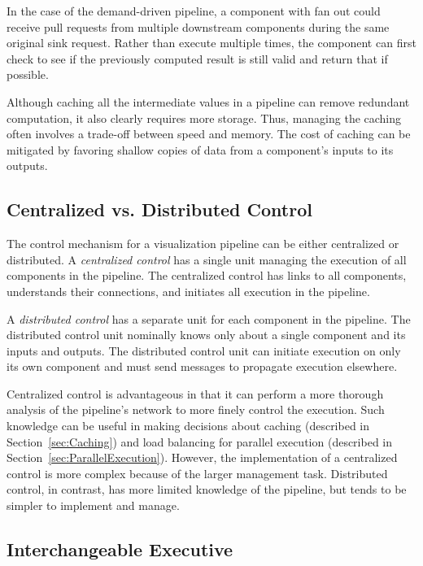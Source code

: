 \documentclass{article}
\newcommand*{\keyterm}[1]{\emph{#1}}
\begin{document}
In the case of the demand-driven pipeline, a component with fan out could
receive pull requests from multiple downstream components during the same
original sink request.  Rather than execute multiple times, the component
can first check to see if the previously computed result is still valid and
return that if possible.

Although caching all the intermediate values in a pipeline can remove
redundant computation, it also clearly requires more storage.  Thus,
managing the caching often involves a trade-off between speed and memory.
The cost of caching can be mitigated by favoring shallow copies of data
from a component's inputs to its outputs.

\subsection{Centralized vs. Distributed Control}
\label{sec:CentralizedDistributed}

The control mechanism for a visualization pipeline can be either
centralized or distributed.  A \keyterm{centralized control} has a single
unit managing the execution of all components in the pipeline.  The
centralized control has links to all components, understands their
connections, and initiates all execution in the pipeline.

A \keyterm{distributed control} has a separate unit for each component in
the pipeline.  The distributed control unit nominally knows only about a
single component and its inputs and outputs.  The distributed control unit
can initiate execution on only its own component and must send messages to
propagate execution elsewhere.

Centralized control is advantageous in that it can perform a more
thorough analysis of the pipeline's network to more finely control the
execution.  Such knowledge can be useful in making decisions about caching
(described in Section~\ref{sec:Caching}) and load balancing for parallel
execution (described in Section~\ref{sec:ParallelExecution}).  However, the
implementation of a centralized control is more complex because of the
larger management task.  Distributed control, in contrast, has more limited
knowledge of the pipeline, but tends to be simpler to implement and
manage.

\subsection{Interchangeable Executive}
\label{sec:InterchangeableExecutive}
\end{document}
